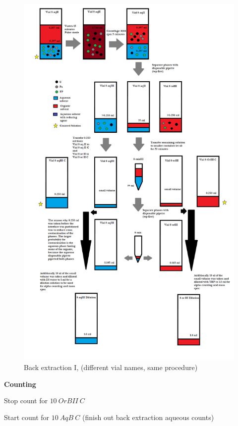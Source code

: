 \documentclass[idxtotoc,hyperref,openany,oneside]{labbook} %
\newcommand{\cmark}{\ding{51}}%
\newcommand{\done}{\rlap{$\square$}{\raisebox{2pt}{\large\hspace{1pt}\cmark}}%
  \hspace{-2.5pt}}
\begin{document}
\begin{figure}[H] %
\begin{center}
  \includegraphics[width=0.8\linewidth]
                  {Figures/Cycle_x3_round_2_extraction_3}
\end{center}
\caption{Back extraction I, (different vial names, same procedure)}
\label{fig:round2_extraction3}
\end{figure}








\textbf{Counting}
\begin{todolist}
\item[\done]{Stop count for $\boxed{10\ OrBII\ C}$}
\item[\done]{Start count for $\boxed{10\ AqB\ C}$ (finish out
back extraction aqueous counts)}
\end{todolist}
\end{document}
